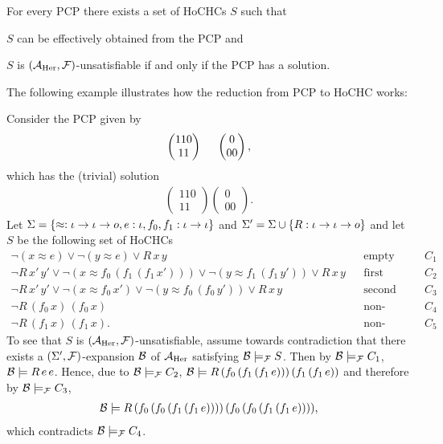 \documentclass[a4paper,twoside,notitlepage,openright,11pt]{report}
\begin{document}
\begin{proposition}
  For every PCP there exists a set of HoCHCs $S$ such that
  \begin{thmlist}
  \item $S$ can be effectively obtained from the PCP and
  \item $S$ is $(\mathcal A_{\operatorname{Her}},\mathcal F)$-unsatisfiable if and only if the PCP has a solution.
  \end{thmlist}
\end{proposition}

The following example illustrates how the reduction from PCP to HoCHC works:

\begin{example}
  Consider the PCP given by
  \begin{align*}
    \begin{pmatrix}110\\11\end{pmatrix}\hspace{0.5cm}\begin{pmatrix}0\\00\end{pmatrix},
  \end{align*}
  which has the (trivial) solution
  \begin{align*}
    \begin{pmatrix}110\\11\end{pmatrix}\begin{pmatrix}0\\00\end{pmatrix}.
  \end{align*}
  Let $\Sigma=\{\approx:\iota\to\iota\to o,e:\iota,f_0,f_1:\iota\to\iota\}$ and $\Sigma'=\Sigma\cup\{R:\iota\to\iota\to o\}$ and let $S$ be the following set of HoCHCs
  \begin{align*}
    \neg (x\approx e)\lor\neg (y\approx e)\lor R\,x\,y&&\text{empty sequence}&&C_1\\
    \neg R\,x'\,y'\lor\neg (x\approx f_0\,(f_1\,(f_1\,x')))\lor\neg (y\approx f_1\,(f_1\,y'))\lor R\,x\,y&&\text{first ``card''}&&C_2\\
    \neg R\,x'\,y'\lor\neg (x\approx f_0\,x')\lor\neg (y\approx f_0\,(f_0\,y'))\lor R\,x\,y&&\text{second ``card''}&&C_3\\
    \neg R\,(f_0\,x)\,(f_0\,x)&&\text{non-empty solution}&&C_4\\
    \neg R\,(f_1\,x)\,(f_1\,x).&&\text{non-empty solution}&&C_5
  \end{align*}
  To see that $S$ is $(\mathcal A_{\operatorname{Her}},\mathcal F)$-unsatisfiable, assume towards contradiction that there exists a $(\Sigma',\mathcal F)$-expansion $\mathcal B$ of $\mathcal A_{\operatorname{Her}}$ satisfying $\mathcal B\models_\mathcal F S$. Then by $\mathcal B\models_\mathcal F C_1$, $\mathcal B\models R\,e\,e$. Hence, due to $\mathcal B\models_\mathcal F C_2$,
  $\mathcal B\models R\,(f_0\,(f_1\,(f_1\,e)))\,(f_1\,(f_1\,e))$
  and therefore by $\mathcal B\models_\mathcal F C_3$,
  \begin{align*}
    \mathcal B\models R\,(f_0\,(f_0\,(f_1\,(f_1\,e))))\,(f_0\,(f_0\,(f_1\,(f_1\,e)))),
  \end{align*}
  which contradicts $\mathcal B\models_\mathcal F C_4$.
\end{example}
\end{document}
